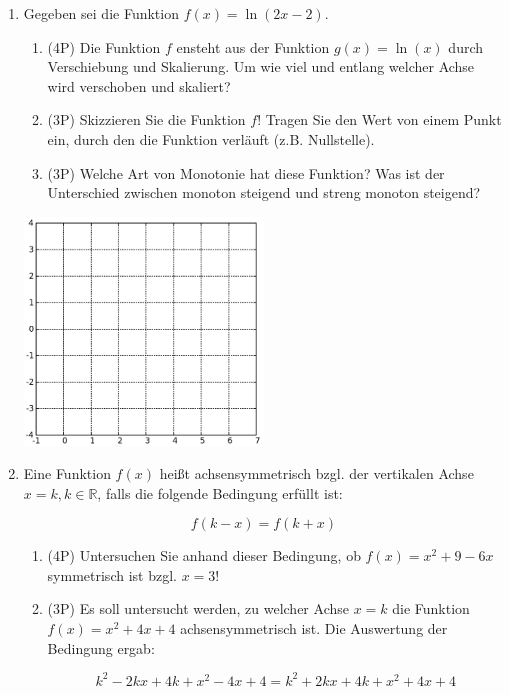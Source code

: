 \documentclass[11pt]{article}
\begin{document}
\begin{enumerate}

\item Gegeben sei die Funktion $f(x) = \ln(2x-2)$.

\begin{enumerate}
\item (4P) Die Funktion $f$ ensteht aus der Funktion $g(x) = \ln(x)$ durch Verschiebung und Skalierung. Um wie viel und entlang welcher Achse wird verschoben und skaliert?
\item (3P) Skizzieren Sie die Funktion $f$! Tragen Sie den Wert von einem Punkt ein, durch den die Funktion verläuft (z.B. Nullstelle).
\item (3P) Welche Art von Monotonie hat diese Funktion? Was ist der Unterschied zwischen monoton steigend und streng monoton steigend?
\end {enumerate}

\begin{center}
\includegraphics[width=0.5\textwidth]{grid_probe.png}
\end{center}

\item Eine Funktion $f(x)$ heißt achsensymmetrisch bzgl. der vertikalen Achse $x=k, k\in\mathbb{R}$, falls die folgende Bedingung erfüllt ist:

$$f(k-x) = f(k+x)$$

\begin{enumerate}

\item (4P) Untersuchen Sie anhand dieser Bedingung, ob $f(x) = x^2+9-6x$ symmetrisch ist bzgl. $x=3$!

\item  (3P) Es soll untersucht werden, zu welcher Achse $x=k$ die Funktion $f(x) = x^2+4x+4$ achsensymmetrisch ist. Die Auswertung der Bedingung ergab:

$$k^2-2kx+4k+x^2-4x+4 = k^2 + 2kx + 4k + x^2 + 4x +4$$


\end{enumerate}
\end{enumerate}
\end{document}
